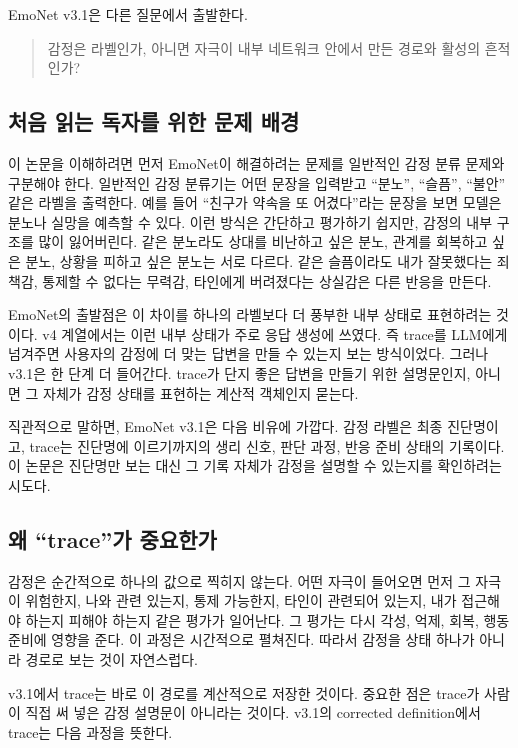 \documentclass[11pt,a4paper]{article}
\begin{document}
EmoNet v3.1은 다른 질문에서 출발한다.

\begin{quote}
감정은 라벨인가, 아니면 자극이 내부 네트워크 안에서 만든 경로와 활성의 흔적인가?
\end{quote}

\subsection{처음 읽는 독자를 위한 문제 배경}

이 논문을 이해하려면 먼저 EmoNet이 해결하려는 문제를 일반적인 감정 분류 문제와 구분해야 한다. 일반적인 감정 분류기는 어떤 문장을 입력받고 ``분노'', ``슬픔'', ``불안'' 같은 라벨을 출력한다. 예를 들어 ``친구가 약속을 또 어겼다''라는 문장을 보면 모델은 분노나 실망을 예측할 수 있다. 이런 방식은 간단하고 평가하기 쉽지만, 감정의 내부 구조를 많이 잃어버린다. 같은 분노라도 상대를 비난하고 싶은 분노, 관계를 회복하고 싶은 분노, 상황을 피하고 싶은 분노는 서로 다르다. 같은 슬픔이라도 내가 잘못했다는 죄책감, 통제할 수 없다는 무력감, 타인에게 버려졌다는 상실감은 다른 반응을 만든다.

EmoNet의 출발점은 이 차이를 하나의 라벨보다 더 풍부한 내부 상태로 표현하려는 것이다. v4 계열에서는 이런 내부 상태가 주로 응답 생성에 쓰였다. 즉 trace를 LLM에게 넘겨주면 사용자의 감정에 더 맞는 답변을 만들 수 있는지 보는 방식이었다. 그러나 v3.1은 한 단계 더 들어간다. trace가 단지 좋은 답변을 만들기 위한 설명문인지, 아니면 그 자체가 감정 상태를 표현하는 계산적 객체인지 묻는다.

직관적으로 말하면, EmoNet v3.1은 다음 비유에 가깝다. 감정 라벨은 최종 진단명이고, trace는 진단명에 이르기까지의 생리 신호, 판단 과정, 반응 준비 상태의 기록이다. 이 논문은 진단명만 보는 대신 그 기록 자체가 감정을 설명할 수 있는지를 확인하려는 시도다.

\subsection{왜 ``trace''가 중요한가}

감정은 순간적으로 하나의 값으로 찍히지 않는다. 어떤 자극이 들어오면 먼저 그 자극이 위험한지, 나와 관련 있는지, 통제 가능한지, 타인이 관련되어 있는지, 내가 접근해야 하는지 피해야 하는지 같은 평가가 일어난다. 그 평가는 다시 각성, 억제, 회복, 행동 준비에 영향을 준다. 이 과정은 시간적으로 펼쳐진다. 따라서 감정을 상태 하나가 아니라 경로로 보는 것이 자연스럽다.

v3.1에서 trace는 바로 이 경로를 계산적으로 저장한 것이다. 중요한 점은 trace가 사람이 직접 써 넣은 감정 설명문이 아니라는 것이다. v3.1의 corrected definition에서 trace는 다음 과정을 뜻한다.
\end{document}
